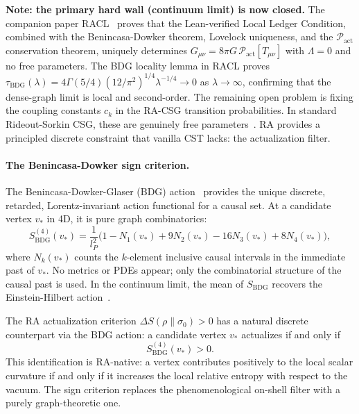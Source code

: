 \documentclass[11pt,a4paper]{article}
\theoremstyle{plain}
\theoremstyle{definition}
\theoremstyle{remark}
\begin{document}
\textbf{Note: the primary hard wall (continuum limit) is now closed.}
The companion paper RACL~\citep{Sandeman2026RACL} proves that the
Lean-verified Local Ledger Condition, combined with the Benincasa-Dowker
theorem, Lovelock uniqueness, and the $\mathcal{P}_{\mathrm{act}}$
conservation theorem, uniquely determines
$G_{\mu\nu} = 8\pi G\,\mathcal{P}_{\mathrm{act}}[T_{\mu\nu}]$ with
$\Lambda = 0$ and no free parameters. The BDG locality lemma in RACL
proves $\tau_{\mathrm{BDG}}(\lambda) = 4\Gamma(5/4)(12/\pi^2)^{1/4}
\lambda^{-1/4} \to 0$ as $\lambda \to \infty$, confirming that
the dense-graph limit is local and second-order.
The remaining open problem is fixing the coupling constants $c_k$ in the RA-CSG
transition probabilities. In standard Rideout-Sorkin CSG, these are genuinely
free parameters~\citep{Sorkin2003}. RA provides a principled discrete constraint
that vanilla CST lacks: the actualization filter.

\paragraph{The Benincasa-Dowker sign criterion.}
The Benincasa-Dowker-Glaser (BDG) action~\citep{Benincasa2010} provides the
unique discrete, retarded, Lorentz-invariant action functional for a causal set.
At a candidate vertex $v_*$ in 4D, it is pure graph combinatorics:
\begin{equation}
  S_{\mathrm{BDG}}^{(4)}(v_*)
  = \frac{1}{l_P^2}
    \bigl(1 - N_1(v_*) + 9N_2(v_*) - 16N_3(v_*) + 8N_4(v_*)\bigr),
  \label{eq:BDG}
\end{equation}
where $N_k(v_*)$ counts the $k$-element inclusive causal intervals in the
immediate past of $v_*$. No metrics or PDEs appear; only the combinatorial
structure of the causal past is used. In the continuum limit, the mean of
$S_{\mathrm{BDG}}$ recovers the Einstein-Hilbert action~\citep{Benincasa2010}.

The RA actualization criterion $\Delta S(\rho\|\sigma_0) > 0$ has a natural
discrete counterpart via the BDG action: a candidate vertex $v_*$ actualizes
if and only if
\begin{equation}
  S_{\mathrm{BDG}}^{(4)}(v_*) > 0.
  \label{eq:BDG_filter}
\end{equation}
This identification is RA-native: a vertex contributes positively to the local
scalar curvature if and only if it increases the local relative entropy with
respect to the vacuum. The sign criterion replaces the phenomenological
on-shell filter with a purely graph-theoretic one.
\end{document}
